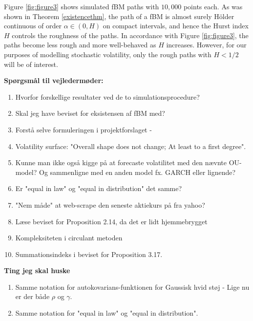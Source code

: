 Figure \ref{fig:figure3} shows simulated fBM paths with $10,000$ points each. As was shown in Theorem \ref{existencethm}, the path of a fBM is almost surely Hölder continuous of order $\alpha\in(0,H)$ on compact intervals, and hence the Hurst index $H$ controls the roughness of the paths. In accordance with Figure \ref{fig:figure3}, the paths become less rough and more well-behaved as $H$ increases. However, for our purposes of modelling stochastic volatility, only the rough paths with $H<1/2$ will be of interest.

\newpage
\textbf{Spørgsmål til vejledermøder:}
\begin{enumerate}
    \item Hvorfor forskellige resultater ved de to simulationsprocedure?
    \item Skal jeg have beviset for eksistensen af fBM med? 
    \item Forstå selve formuleringen i projektforslaget -
    \item Volatility surface: "Overall shape does not change; At least to a first degree".
    \item Kunne man ikke også kigge på at forecaste volatilitet med den nævnte OU-model? Og sammenligne med en anden model fx. GARCH eller lignende? 
    \item Er "equal in law" og "equal in distribution" det samme?
    \item "Nem måde" at web-scrape den seneste aktiekurs på fra yahoo?
    \item Læse beviset for Proposition 2.14, da det er lidt hjemmebrygget
    \item Kompleksiteten i circulant metoden
    \item Summationsindeks i beviset for Proposition 3.17.
\end{enumerate}
\textbf{Ting jeg skal huske}
\begin{enumerate}
    \item Samme notation for autokovarians-funktionen for Gaussisk hvid støj - Lige nu er der både $\rho$ og $\gamma$.
    \item Samme notation for "equal in law" og "equal in distribution".
\end{enumerate}